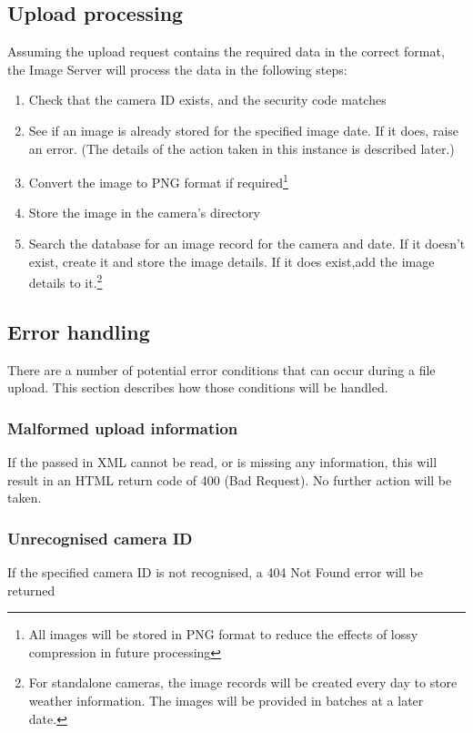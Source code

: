 \documentclass[11pt]{article}
\begin{document}
\subsection{Upload processing}
Assuming the upload request contains the required data in the correct format, the Image Server will process the data in the following steps:

\begin{enumerate}
\item Check that the camera ID exists, and the security code matches
\item See if an image is already stored for the specified image date. If it does, raise an error. (The details of the action taken in this instance is described later.)
\item Convert the image to PNG format if required\footnote{All images will be stored in PNG format to reduce the effects of lossy compression in future processing}
\item Store the image in the camera's directory
\item Search the database for an image record for the camera and date. If it doesn't exist, create it and store the image details. If it does exist,add the image details to it.\footnote{For standalone cameras, the image records will be created every day to store weather information. The images will be provided in batches at a later date.}
\end{enumerate}

\subsection{Error handling}
There are a number of potential error conditions that can occur during a file upload. This section describes how those conditions will be handled.

\subsubsection{Malformed upload information}
If the passed in XML cannot be read, or is missing any information, this will result in an HTML return code of 400 (Bad Request). No further action will be taken.

\subsubsection{Unrecognised camera ID}
If the specified camera ID is not recognised, a 404 Not Found error will be returned
\end{document}
